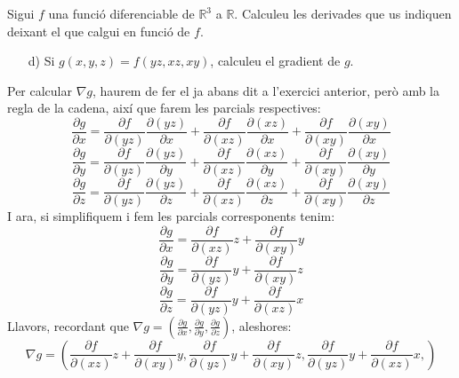 \documentclass[a4paper, 12pt]{article}
\begin{document}
    \setcounter{numex}{25}
    \begin{exercici}
        Sigui $f$ una funció diferenciable de $\mathbb{R}^3$ a $\mathbb{R}$. Calculeu les derivades
        que us indiquen deixant el que calgui en funció de $f$.
        \begin{itemize}
            \item[d)] Si $g(x,y,z) = f(yz, xz, xy)$, calculeu el gradient de $g$.
        \end{itemize}
    \end{exercici}
    \begin{solucio}
        Per calcular $\nabla g$, haurem de fer el ja abans dit a l'exercici anterior, però amb la
        regla de la cadena, així que farem les parcials respectives:
        \begin{displaymath}
            \frac{\partial g}{\partial x} = \frac{\partial f}{\partial (yz)} \frac{\partial (yz)}{\partial x} + \frac{\partial f}{\partial (xz)} \frac{\partial (xz)}{\partial x} + \frac{\partial f}{\partial (xy)} \frac{\partial (xy)}{\partial x}
        \end{displaymath}
        \begin{displaymath}
            \frac{\partial g}{\partial y} = \frac{\partial f}{\partial (yz)} \frac{\partial (yz)}{\partial y} + \frac{\partial f}{\partial (xz)} \frac{\partial (xz)}{\partial y} + \frac{\partial f}{\partial (xy)} \frac{\partial (xy)}{\partial y}
        \end{displaymath}
        \begin{displaymath}
            \frac{\partial g}{\partial z} = \frac{\partial f}{\partial (yz)} \frac{\partial (yz)}{\partial z} + \frac{\partial f}{\partial (xz)} \frac{\partial (xz)}{\partial z} + \frac{\partial f}{\partial (xy)} \frac{\partial (xy)}{\partial z}
        \end{displaymath}
        I ara, si simplifiquem i fem les parcials corresponents tenim:
        \begin{displaymath}
            \frac{\partial g}{\partial x} = \frac{\partial f}{\partial (xz)} z + \frac{\partial f}{\partial (xy)} y
        \end{displaymath}
        \begin{displaymath}
            \frac{\partial g}{\partial y} = \frac{\partial f}{\partial (yz)} y + \frac{\partial f}{\partial (xy)} z
        \end{displaymath}
        \begin{displaymath}
            \frac{\partial g}{\partial z} = \frac{\partial f}{\partial (yz)} y + \frac{\partial f}{\partial (xz)} x
        \end{displaymath}
        Llavors, recordant que $\nabla g = \left(\frac{\partial g}{\partial x}, \frac{\partial g}{\partial y}, \frac{\partial g}{\partial z}\right)$, aleshores:
        \begin{displaymath}
            \nabla g = \left(\frac{\partial f}{\partial (xz)} z + \frac{\partial f}{\partial (xy)} y, \frac{\partial f}{\partial (yz)} y + \frac{\partial f}{\partial (xy)} z, \frac{\partial f}{\partial (yz)} y + \frac{\partial f}{\partial (xz)} x, \right) 
        \end{displaymath}
    \end{solucio}
\end{document}
